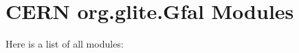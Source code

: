 \section{CERN org.glite.Gfal Modules}
Here is a list of all modules:\begin{CompactList}
\item {}
\end{CompactList}
